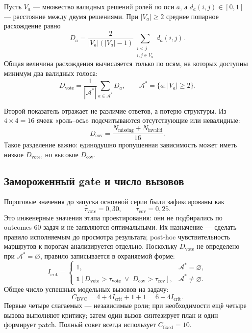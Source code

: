 \documentclass[11pt]{article}
\begin{document}
Пусть \(V_a\) --- множество валидных решений ролей по оси \(a\), а
\(d_a(i,j)\in[0,1]\) --- расстояние между двумя решениями. При
\(|V_a|\geq2\) среднее попарное расхождение равно
\[
D_a =
\frac{2}{|V_a|(|V_a|-1)}
\sum_{\substack{i<j\\i,j\in V_a}} d_a(i,j).
\]
Общая величина расхождения вычисляется только по осям, на которых доступны
минимум два валидных голоса:
\[
D_{\mathrm{vote}} =
\frac{1}{|\mathcal{A}^{\ast}|}
\sum_{a\in\mathcal{A}^{\ast}} D_a,\qquad
\mathcal{A}^{\ast}=\{a:|V_a|\geq2\}.
\]

Второй показатель отражает не различие ответов, а потерю структуры. Из
\(4\times4=16\) ячеек «роль--ось» подсчитываются отсутствующие или
невалидные:
\[
D_{\mathrm{cov}} =
\frac{N_{\mathrm{missing}}+N_{\mathrm{invalid}}}{16}.
\]
Такое разделение важно: единодушно пропущенная зависимость может иметь низкое
\(D_{\mathrm{vote}}\), но высокое \(D_{\mathrm{cov}}\).

\subsection{Замороженный gate и число вызовов}

Пороговые значения до запуска основной серии были зафиксированы как
\[
\tau_{\mathrm{vote}}=0{,}30,\qquad
\tau_{\mathrm{cov}}=0{,}25.
\]
Это инженерные значения этапа проектирования: они не подбирались по outcomes
60 задач и не заявляются оптимальными. Их назначение --- сделать правило
исполняемым до просмотра результата; post-hoc чувствительность маршрутов к
порогам анализируется отдельно. Поскольку \(D_{\mathrm{vote}}\) не определено
при \(\mathcal{A}^{\ast}=\varnothing\), правило записывается в охраняемой форме:
\[
I_{\mathrm{crit}} =
\begin{cases}
1, & \mathcal{A}^{\ast}=\varnothing,\\[2pt]
\mathbb{1}\!\left[
D_{\mathrm{vote}}>\tau_{\mathrm{vote}}
\;\lor\;
D_{\mathrm{cov}}>\tau_{\mathrm{cov}}
\right], & \mathcal{A}^{\ast}\neq\varnothing.
\end{cases}
\]
Общее число успешных модельных вызовов на задачу:
\[
C_{\mathrm{BVC}}=4+4I_{\mathrm{crit}}+1+1
=6+4I_{\mathrm{crit}}.
\]
Первые четыре слагаемых --- независимые роли; при необходимости ещё четыре
вызова выполняют критику; затем один вызов синтезирует план и один формирует
patch. Полный совет всегда использует
\(C_{\mathrm{fixed}}=10\).
\end{document}
